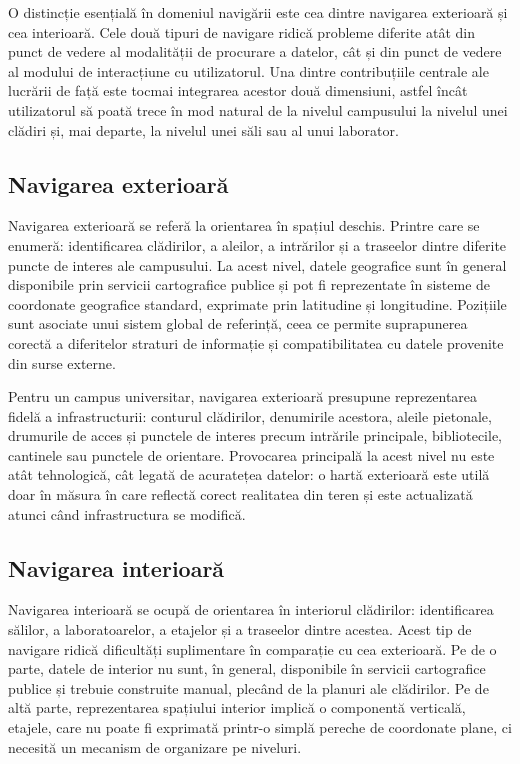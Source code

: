 O distincție esențială în domeniul navigării este cea dintre navigarea
exterioară  și cea interioară. Cele două
tipuri de navigare ridică probleme diferite atât din punct de vedere al
modalității de procurare a  datelor, cât și din punct de vedere al modului de
interacțiune cu utilizatorul. Una dintre contribuțiile centrale ale lucrării de
față este tocmai integrarea acestor două dimensiuni, astfel
încât utilizatorul să poată trece în mod natural de la nivelul campusului la
nivelul unei clădiri și, mai departe, la nivelul unei săli sau al unui laborator.

\subsection{Navigarea exterioară}
\label{subsec:outdoor}

Navigarea exterioară se referă la orientarea în spațiul deschis. Printre care se enumeră: identificarea
clădirilor, a aleilor, a intrărilor și a traseelor dintre diferite puncte de
interes ale campusului. La acest nivel, datele geografice sunt în general
disponibile prin servicii cartografice publice și pot fi reprezentate în
sisteme de coordonate geografice standard, exprimate prin latitudine și
longitudine. Pozițiile sunt asociate unui sistem global de referință, ceea ce
permite suprapunerea corectă a diferitelor straturi de informație și
compatibilitatea cu datele provenite din surse externe.

Pentru un campus universitar, navigarea exterioară presupune reprezentarea
fidelă a infrastructurii: conturul clădirilor, denumirile acestora, aleile
pietonale, drumurile de acces și punctele de interes precum intrările
principale, bibliotecile, cantinele sau punctele de orientare. Provocarea
principală la acest nivel nu este atât tehnologică, cât legată de acuratețea datelor: o hartă exterioară este utilă doar în măsura în care
reflectă corect realitatea din teren și este actualizată atunci când
infrastructura se modifică.

\subsection{Navigarea interioară}
\label{subsec:indoor}

Navigarea interioară se ocupă de orientarea în interiorul clădirilor:
identificarea sălilor, a laboratoarelor, a etajelor și a traseelor dintre
acestea. Acest tip de navigare ridică dificultăți suplimentare în comparație cu
cea exterioară. Pe de o parte, datele de interior nu sunt, în general,
disponibile în servicii cartografice publice și trebuie construite manual,
plecând de la planuri ale clădirilor. Pe de altă parte, reprezentarea spațiului
interior implică o componentă verticală, etajele, care nu poate fi exprimată
printr-o simplă pereche de coordonate plane, ci necesită un mecanism de
organizare pe niveluri.

